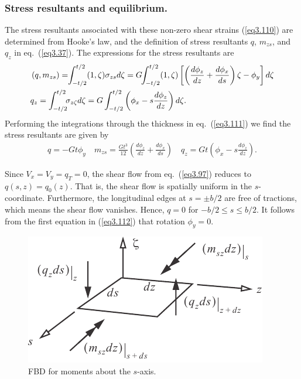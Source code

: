 \documentclass{AeroStructure-ERJohnson}
\begin{document}
\subsubsection{Stress resultants and equilibrium.} The stress resultants associated with these non-zero shear strains (\ref{eq3.110}) are determined from Hooke's law, and the definition of stress resultants $q$, $m_{z s}$, and $q_{z}$ in eq.~(\ref{eq3.37}). The expressions for the stress resultants are
\begin{align}\label{eq3.111}
&\left(q, m_{z s}\right)=\hspace*{-3pt}\int_{-t / 2}^{t / 2}(1, \zeta) \sigma_{z s} d \zeta=G\hspace*{-3pt} \int_{-t / 2}^{t / 2}(1, \zeta)\left[\left(\frac{d \phi_{z}}{d z}+\frac{d \phi_{x}}{d s}\right) \zeta-\phi_{y}\right] d \zeta \nonumber\\ &q_{z}=\int_{-t / 2}^{t / 2}\hspace*{-4pt} \sigma_{z \zeta} d \zeta=G \int_{-t / 2}^{t / 2}\left(\phi_{x}-s \frac{d \phi_{z}}{d z}\right) d \zeta.
\end{align}
Performing the integrations through the thickness in eq.~(\ref{eq3.111}) we find the stress resultants are given by
\begin{align}\label{eq3.112}
q=-G t \phi_{y} \quad m_{z s}=\frac{G t^{3}}{12}\left(\frac{d \phi_{z}}{d z}+\frac{d \phi_{x}}{d s}\right) \quad q_{z}=G t\left(\phi_{x}-s \frac{d \phi_{z}}{d z}\right).
\end{align}

\vspace*{-1pc}

Since $V_{x}=V_{y}=q_{T}=0$, the shear flow from eq.~(\ref{eq3.97}) reduces to $q(s, z)=q_{0}(z)$. That is, the shear flow is spatially uniform in the $s$-coordinate. Furthermore, the longitudinal edges at $s=\pm b / 2$ are free of tractions, which means the shear flow vanishes. Hence, $q=0$ for $-b / 2 \leq s \leq b / 2$. It follows from the first equation in (\ref{eq3.112}) that rotation $\phi_{y}=0$.

\begin{figure}\vspace*{-15pt}
\includegraphics{Figure_3-15.pdf}
\caption{FBD for moments about the $s$-axis.\label{fig3.15}}
\end{figure}
\end{document}
